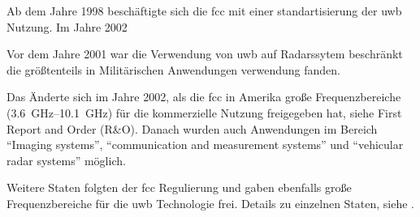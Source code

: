 Ab dem Jahre 1998 beschäftigte sich die \ac{fcc} mit einer standartisierung der \ac{uwb} Nutzung. Im Jahre 2002 

Vor dem Jahre 2001 war die Verwendung von \ac{uwb} auf Radarssytem beschränkt die größtenteils in Militärischen Anwendungen verwendung fanden.\cite{yang2004uwbcom}

Das Änderte sich im Jahre 2002, als die \ac{fcc} in Amerika große Frequenzbereiche (\SIrange{3.6}{10.1}{\GHz}) für die kommerzielle Nutzung freigegeben hat, siehe First Report and Order (R\&O). Danach wurden auch Anwendungen im Bereich ``Imaging systems'', ``communication and measurement systems'' und ``vehicular radar systems'' möglich.\cite{yang2004uwbcom}

\begin{comment}
[12] FCC First Report and Order: In the matter of Revision of Part 15 of the
Commission’s Rules Regarding Ultra-Wideband Transmission Systems,
FCC 02–48, April 2002.
\end{comment}

Weitere Staten folgten der \ac{fcc} Regulierung und gaben ebenfalls große Frequenzbereiche für die \ac{uwb} Technologie frei. Details zu einzelnen Staten, siehe \cite{decawave2015uwbreg}.

\begin{comment}
Eine aktuelle Recherche (3. Januar 2017) in den einschlägigen deutschen Bestellportalen (Ebay, Amazon, Conrad, Euronics, …) ergab, dass Geräte mit CWUSB-Unterstützung dort derzeit in Deutschland nicht bestellbar sind. Bei Amazon ließen sich in den Kundenrezensionen Spuren finden, dass im Jahr 2010 entsprechende Geräte auch vertrieben wurden. Zwei Entwicklungen machen es den Geräten schwer, sich am Markt zu behaupten: Einerseits wurde mit USB 3.0 die Datendurchsatzrate deutlich angehoben, was die Anforderungen an den Wireless-USB-Standard verschärft. Andererseits hat die Marktentwicklung bei den Smartphones die Verbreitung des Bluetooth-Standards stark ausgebaut. Während das Bluetooth-Konsortium seinen Standard laufend weiterentwickelt (zuletzt 2016 mit Version 5), datiert die letzte Version des USBCV-Tools für den Test und die Entwicklung von Wireless USB auf den 17. Juli 2009. Vor diesem Hintergrund erscheint es derzeit fraglich, ob CWUSB noch einmal aus der Versenkung auftauchen wird. [Wikipedia, Wireless USB]

Vielleicht sollte man sich diese Einschätzung für das Fazit aufgewahren? Komnsumer Markt nein, Spezial Markt ja.
\end{comment}

